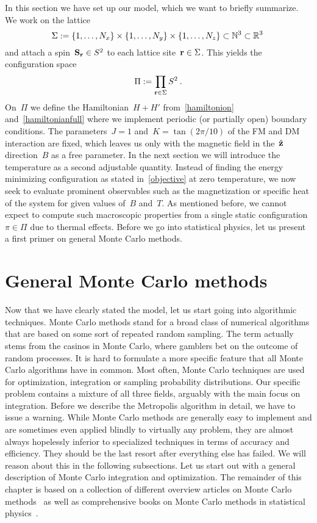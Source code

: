 In this section we have set up our model, which we want to briefly summarize. We
work on the lattice
%
\begin{equation}
  \Sigma := \{1,\dots,N_x\} \times \{1,\dots,N_y\} \times
  \{1,\dots,N_z\} \subset \mathbb{N}^3 \subset \mathbb{R}^3\:
\end{equation}
%
and attach a spin~$\mathbf{S}_{\mathbf{r}} \in S^2$ to each lattice site~$\mathbf{r} \in \Sigma$. This
yields the configuration space
%
\begin{equation}
  \Pi := \prod_{\mathbf{r} \in \Sigma} S^2\:.
\end{equation}
%
On~$\Pi$ we define the Hamiltonian~$H+H'$ from~\eqref{hamiltonion}
and~\eqref{hamiltonianfull} where we implement periodic (or partially open)
boundary conditions. The parameters~$J=1$ and~$K=\tan(2\pi / 10)$ of the FM and
DM interaction are fixed, which leaves us only with the magnetic field in
the~$\hat{\mathbf{z}}$ direction~$B$ as a free parameter. In the next section we will
introduce the temperature as a second adjustable quantity. Instead of finding
the energy minimizing configuration as stated in~\eqref{objective} at zero
temperature, we now seek to evaluate prominent observables such as the
magnetization or specific heat of the system for given values of~$B$ and~$T$. As
mentioned before, we cannot expect to compute such macroscopic properties from a
single static configuration~$\pi \in \Pi$ due to thermal effects. Before we go
into statistical physics, let us present a first primer on general Monte Carlo
methods.
%
\section{General Monte Carlo methods}\label{sec:mctheory}
%
Now that we have clearly stated the model, let us start going into algorithmic
techniques. Monte Carlo methods stand for a broad class of numerical algorithms
that are based on some sort of repeated random sampling. The term actually stems
from the casinos in Monte Carlo, where gamblers bet on the outcome of random
processes. It is hard to formulate a more specific feature that all Monte Carlo
algorithms have in common. Most often, Monte Carlo techniques are used for
optimization, integration or sampling probability distributions. Our specific
problem contains a mixture of all three fields, arguably with the main focus on
integration. Before we describe the Metropolis algorithm in detail, we have to
issue a warning. While Monte Carlo methods are generally easy to implement and
are sometimes even applied blindly to virtually any problem, they are almost
always hopelessly inferior to specialized techniques in terms of accuracy and
efficiency. They should be the last resort after everything else has failed. We
will reason about this in the following subsections. Let us start out with a
general description of Monte Carlo integration and optimization. The remainder
of this chapter is based on a collection of different overview articles on Monte
Carlo methods~\cite{mc09, mc14, mc00} as well as comprehensive books on Monte
Carlo methods in statistical physics~\cite{mcbook, optinphysics}.

